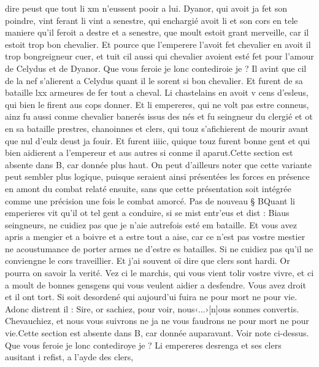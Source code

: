 \documentclass{article}
\begin{document}
\begin{pages}
   dire peust que tout li xm n’eussent pooir a lui. 
   Dyanor, qui avoit ja fet son poindre, vint ferant
      li vint a senestre, qui enchargié avoit li et son cors en tele maniere qu'il feroit 
   a destre et a senestre, que moult estoit grant merveille, car il estoit 
      trop bon chevalier. 
   Et pource que l’emperere 
      l’avoit fet chevalier en avoit il 
      trop bongreigneur cuer, 
      et tuit cil aussi qui chevalier avoient esté fet pour l’amour de Celydus et de 
      Dyanor. 
      Que vous feroie je lonc contediroie je ? 
      Il avint que cil de la nef s’alierent a Celydus 
   quant il le sorent si bon chevalier. Et furent de sa bataille lxx armeures de fer tout a cheval. 
   Li chastelains en avoit v cens d’esleus, qui bien le firent aus cops donner. 
   Et li empereres, qui ne volt pas estre conneus, 
      ainz fu aussi conme chevalier banerés issus des nés et 
      fu seingneur du clergié et ot en sa bataille prestres, 
   chanoinnes et clers, qui touz s’afichierent de mourir avant que nul d’eulz deust ja fouir. Et furent 
      iiiic, quique touz furent bonne gent 
      et qui bien aidierent a l’empereur et aus autres si conme 
      il aparut.Cette section est absente dans B, car donnée plus haut.
      On peut d'ailleurs noter que cette variante peut sembler plus logique, puisque seraient ainsi présentées les forces en présence
      en amont du combat relaté ensuite, sans que cette présentation soit intégrée comme une précision une fois le combat amorcé. \pend
\pstart Pas de nouveau § BQuant 
   li emperieres vit qu’il ot tel gent a conduire, si se mist entr’eus et dist :
   Biaus seingneurs, ne cuidiez pas que je n’aie autrefois esté em bataille. 
   Et vous avez apris a mengier et a boivre et a estre tout a aise, car ce n’est pas vostre mestier ne acoustumance de porter armes 
   ne d’estre es batailles. Si ne cuidiez pas qu’il ne conviengne le cors traveillier. Et j’ai souvent oï dire que clers sont hardi. 
   Or pourra on savoir la verité. Vez ci le marchis, qui vous vient tolir vostre vivre, 
      et ci a moult de bonnes gensgens 
      qui vous veulent aidier a desfendre. Vous avez droit et il ont tort. Si soit desordené qui aujourd’ui fuira ne pour mort ne pour 
      vie.
   Adonc distrent il :
   Sire, or sachiez, pour voir, nous‹...›[n]ous 
      sonmes convertis. Chevauchiez, et nous vous suivrons ne ja ne vous faudrons 
      ne pour mort ne pour vie.Cette section est absente dans B,
         car donnée auparavant. Voir note ci-dessus.
   Que vous feroie je lonc contediroye je ? 
   Li empereres 
   desrenga et ses clers ausitant i refist, a l'ayde des clers, 

\end{pages}
\end{document}
